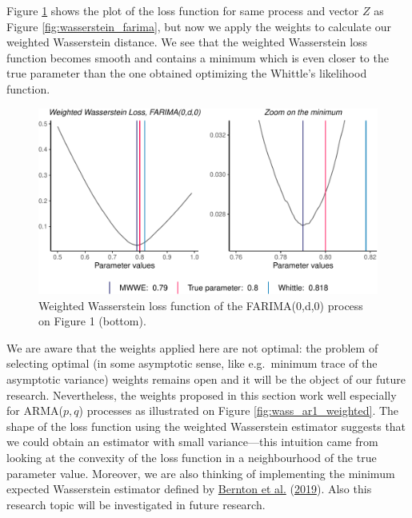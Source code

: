\documentclass[
  11pt,
]{article}
\begin{document}
Figure \ref{fig:weighted_wasserstein} shows the plot of the loss
function for same process and vector \(Z\) as Figure
\ref{fig:wasserstein_farima}, but now we apply the weights to calculate
our weighted Wasserstein distance. We see that the weighted Wasserstein
loss function becomes smooth and contains a minimum which is even closer
to the true parameter than the one obtained optimizing the Whittle's
likelihood function.

\begin{figure}

{\centering \includegraphics[width=0.6\linewidth]{Master_thesis_V5_files/figure-latex/weighted_wasserstein-1} 

}

\caption{Weighted Wasserstein loss function of the FARIMA(0,d,0) process on Figure 1 (bottom).}\label{fig:weighted_wasserstein}
\end{figure}

We are aware that the weights applied here are not optimal: the problem
of selecting optimal (in some asymptotic sense, like e.g.~minimum trace
of the asymptotic variance) weights remains open and it will be the
object of our future research. Nevertheless, the weights proposed in
this section work well especially for ARMA(\(p,q\)) processes as
illustrated on Figure \ref{fig:wass_ar1_weighted}. The shape of the loss
function using the weighted Wasserstein estimator suggests that we could
obtain an estimator with small variance---this intuition came from
looking at the convexity of the loss function in a neighbourhood of the
true parameter value. Moreover, we are also thinking of implementing the
minimum expected Wasserstein estimator defined by
\protect\hyperlink{ref-bernton2019parameter}{Bernton et al.}
(\protect\hyperlink{ref-bernton2019parameter}{2019}). Also this research
topic will be investigated in future research.
\end{document}
